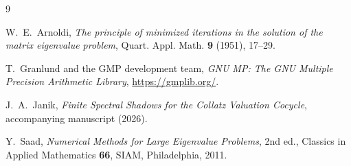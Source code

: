 \documentclass[11pt]{article}
\theoremstyle{remark}
\begin{document}
\begin{thebibliography}{9}

 W.~E.~Arnoldi, \emph{The principle of minimized
iterations in the solution of the matrix eigenvalue problem}, Quart. Appl.
Math. \textbf{9} (1951), 17--29.

 T.~Granlund and the GMP development team, \emph{GNU MP: The GNU
Multiple Precision Arithmetic Library}, \url{https://gmplib.org/}.

 J.~A.~Janik, \emph{Finite Spectral Shadows for the Collatz
Valuation Cocycle}, accompanying manuscript (2026).

 Y.~Saad, \emph{Numerical Methods for Large Eigenvalue
Problems}, 2nd ed., Classics in Applied Mathematics \textbf{66}, SIAM,
Philadelphia, 2011.

\end{thebibliography}
\end{document}
